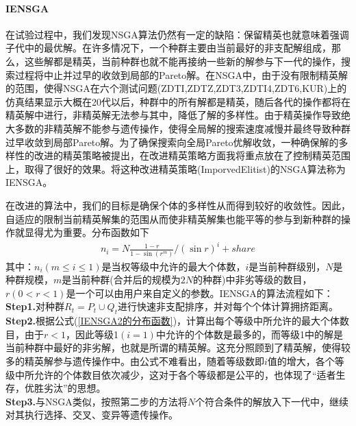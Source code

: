             \paragraph{IENSGA}在试验过程中，我们发现NSGA算法仍然有一定的缺陷：保留精英也就意味着强调子代中的最优解。在许多情况下，一个种群主要由当前最好的非支配解组成，那么，这些解都是精英，当前种群也就不能再接纳一些新的解参与下一代的操作，搜索过程将中止并过早的收敛到局部的Pareto解。在NSGA中，由于没有限制精英解的范围，使得NSGA在六个测试问题(ZDTI,ZDTZ,ZDT3,ZDTI4,ZDT6,KUR)上的仿真结果显示大概在20代以后，种群中的所有解都是精英，随后各代的操作都将在精英解中进行，非精英解无法参与其中，降低了解的多样性。由于精英操作导致绝大多数的非精英解不能参与遗传操作，使得全局解的搜索速度减慢并最终导致种群过早收敛到局部Pareto解。为了确保搜索向全局Pareto优解收敛，一种确保解的多样性的改进的精英策略被提出，在改进精英策略方面我将重点放在了控制精英范围上，取得了很好的效果。将这种改进精英策略(ImporvedElitist)的NSGA算法称为IENSGA。
            \par
            在改进的算法中，我们的目标是确保个体的多样性从而得到较好的收敛性。因此，自适应的限制当前精英解集的范围从而使非精英解集也能平等的参与到新种群的操作就显得尤为重要。分布函数如下
            \begin{align}
            \label{IENSGA2的分布函数}
            n_i = N\frac{1-r}{1-\sin(r^m)}/(\sin r)^i+share
            \end{align}
            其中：$n_i(m \leqslant i \leqslant 1)$是当权等级中允许的最大个体数，$i$是当前种群级别，$N$是种群规模，$m$是当前种群(合并后的规模为$2N$的种群)中非劣等级的数目，$r(0<r<1)$是一个可以由用户来自定义的参数。IENSGA的算法流程如下：\\
            \textbf{Step1.}对种群$R_t = P_t \cup Q_t$进行快速非支配排序，并对每个个体计算拥挤距离。\\
            \textbf{Step2.}根据公式(\ref{IENSGA2的分布函数})，计算出每个等级中所允许的最大个体数目，由于$r<1$，因此等级1$(i=1)$中允许的个体数是最多的，而等级1中的解是当前种群中最好的非劣解，也就是所谓的精英解。这充分照顾到了精英解，使得较多的精英解参与遗传操作中。由公式不难看出，随着等级数即$i$值的增大，各个等级中所允许的个体数目依次减少，这对于各个等级都是公平的，也体现了“适者生存，优胜劣汰”的思想。\\
            \textbf{Step3.}与NSGA类似，按照第二步的方法将$N$个符合条件的解放入下一代中，继续对其执行选择、交叉、变异等遗传操作。


